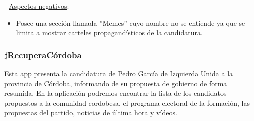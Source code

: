  - \underline{Aspectos negativos}:

\begin{itemize}
	\item Posee una sección llamada ''Memes'' cuyo nombre no se entiende ya que se limita a mostrar carteles propagandísticos de la candidatura. 
\end{itemize}

\subsubsection{$\sharp$RecuperaCórdoba}
Esta app presenta la candidatura de Pedro García de Izquierda Unida a la provincia de Córdoba, informando de su propuesta de gobierno de forma resumida. En la aplicación podremos encontrar la lista de los candidatos propuestos a la comunidad cordobesa, el programa electoral de la formación, las propuestas del partido, noticias de última hora y vídeos.

